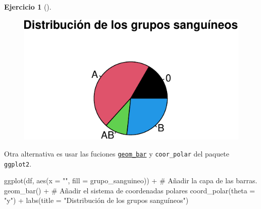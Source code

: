 \documentclass[
  a4paper,
]{scrreport}
\newenvironment{Shaded}{\begin{snugshade}}{\end{snugshade}}
\newcommand{\AttributeTok}[1]{\textcolor[rgb]{0.40,0.45,0.13}{#1}}
\newcommand{\CommentTok}[1]{\textcolor[rgb]{0.37,0.37,0.37}{#1}}
\newcommand{\FunctionTok}[1]{\textcolor[rgb]{0.28,0.35,0.67}{#1}}
\newcommand{\NormalTok}[1]{\textcolor[rgb]{0.00,0.23,0.31}{#1}}
\newcommand{\SpecialCharTok}[1]{\textcolor[rgb]{0.37,0.37,0.37}{#1}}
\newcommand{\StringTok}[1]{\textcolor[rgb]{0.13,0.47,0.30}{#1}}
\theoremstyle{definition}
\newtheorem{exercise}{Ejercicio}[chapter]
\theoremstyle{remark}
\begin{document}
\begin{exercise}[]
\begin{tcolorbox}
\begin{figure}[H]

{\centering \includegraphics{./03-frecuencias-graficos_files/figure-pdf/unnamed-chunk-26-1.pdf}

}

\end{figure}

\end{tcolorbox}

\begin{tcolorbox}[enhanced jigsaw, coltitle=black, breakable, bottomtitle=1mm, colbacktitle=quarto-callout-tip-color!10!white, rightrule=.15mm, opacityback=0, opacitybacktitle=0.6, left=2mm, colframe=quarto-callout-tip-color-frame, title=\textcolor{quarto-callout-tip-color}{\faLightbulb}\hspace{0.5em}{Solución 2}, toprule=.15mm, toptitle=1mm, arc=.35mm, colback=white, titlerule=0mm, bottomrule=.15mm, leftrule=.75mm]

Otra alternativa es usar las fuciones
\href{https://aprendeconalf.es/manual-r/07-graficos.html\#diagrama-de-sectores}{\texttt{geom\_bar}}
y \texttt{coor\_polar} del paquete \texttt{ggplot2}.

\begin{Shaded}
\begin{Highlighting}[]
\FunctionTok{ggplot}\NormalTok{(df, }\FunctionTok{aes}\NormalTok{(}\AttributeTok{x =} \StringTok{""}\NormalTok{, }\AttributeTok{fill =}\NormalTok{ grupo\_sanguineo)) }\SpecialCharTok{+}
    \CommentTok{\# Añadir la capa de las barras.}
    \FunctionTok{geom\_bar}\NormalTok{() }\SpecialCharTok{+}
    \CommentTok{\# Añadir el sistema de coordenadas polares}
    \FunctionTok{coord\_polar}\NormalTok{(}\AttributeTok{theta =} \StringTok{"y"}\NormalTok{) }\SpecialCharTok{+}
    \FunctionTok{labs}\NormalTok{(}\AttributeTok{title =} \StringTok{"Distribución de los grupos sanguíneos"}\NormalTok{)}
\end{Highlighting}
\end{Shaded}


\end{tcolorbox}
\end{exercise}
\end{document}
